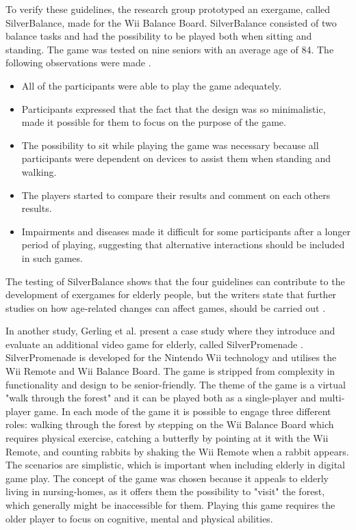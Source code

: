To verify these guidelines, the research group prototyped an exergame, called SilverBalance, made for the Wii Balance Board. SilverBalance consisted of two balance tasks and had the possibility to be played both when sitting and standing. The game was tested on nine seniors with an average age of 84. The following observations were made \cite{gerling1}.
\begin{itemize}
\item All of the participants were able to play the game adequately. 
\item Participants expressed that the fact that the design was so minimalistic, made it possible for them to focus on the purpose of the game. 
\item The possibility to sit while playing the game was necessary because all participants were dependent on devices to assist them when standing and walking.
\item The players started to compare their results and comment on each others results.
\item Impairments and diseases made it difficult for some participants after a longer period of playing, suggesting that alternative interactions should be included in such games.
\end{itemize}

The testing of SilverBalance shows that the four guidelines can contribute to the development of exergames for elderly people, but the writers state that further studies on how age-related changes can affect games, should be carried out \cite{gerling1}.

In another study, Gerling et al. present a case study where they introduce and evaluate an additional video game for elderly, called SilverPromenade \cite{gerling2}.  SilverPromenade is developed for the Nintendo Wii technology and utilises the Wii Remote and Wii Balance Board. The game is stripped from complexity in functionality and design to be senior-friendly. The theme of the game is a virtual "walk through the forest" and it can be played both as a single-player and multi-player game. In each mode of the game it is possible to engage three different roles: walking through the forest by stepping on the Wii Balance Board which requires physical exercise, catching a butterfly by pointing at it with the Wii Remote, and counting rabbits by shaking the Wii Remote when a rabbit appears. The scenarios are simplistic, which is important when including elderly in digital game play. The concept of the game was chosen because it appeals to elderly living in nursing-homes, as it offers them the possibility to "visit" the forest, which generally might be inaccessible for them. Playing this game requires the older player to focus on cognitive, mental and physical abilities. 

